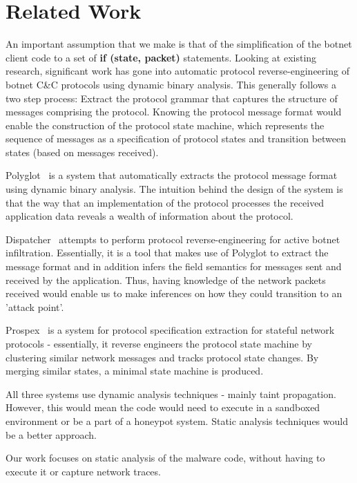 \documentclass[]{article}
\begin{document}
\section{Related Work}
An important assumption that we make is that of the simplification of the botnet client code to a set of \textbf{if (state, packet)} statements. Looking at existing research, significant work has gone into automatic protocol reverse-engineering of botnet C\&C protocols using dynamic binary analysis. This generally follows a two step process: Extract the protocol grammar that captures the structure of messages comprising the protocol. Knowing the protocol message format would enable the construction of the protocol state machine, which represents the sequence of messages as a specification of protocol states and transition between states (based on messages received).

Polyglot~\cite{polyglot} is a system that automatically extracts the protocol message format using dynamic binary analysis. The intuition behind the design of the system is that the  way  that  an  implementation  of  the protocol processes the received application data  reveals a wealth of information about the protocol.

Dispatcher~\cite{dispatcher} attempts to perform protocol reverse-engineering for active botnet infiltration. Essentially, it is a tool that makes use of Polyglot to extract the message format and in addition infers the field semantics for messages sent and received by the application. Thus, having knowledge of the network packets received would enable us to make inferences on how they could transition to an 'attack point'.

Prospex~\cite{prospex} is a system for protocol specification extraction for stateful network protocols - essentially, it reverse engineers the protocol state machine by clustering similar network messages and tracks protocol state changes. By merging similar states, a minimal state machine is produced.

All three systems use dynamic analysis techniques - mainly taint propagation. However, this would mean the code would need to execute in a sandboxed environment or be a part of a honeypot system. Static analysis techniques would be a better approach.

Our work focuses on static analysis of the malware code, without having to execute it or capture network traces.
\end{document}
